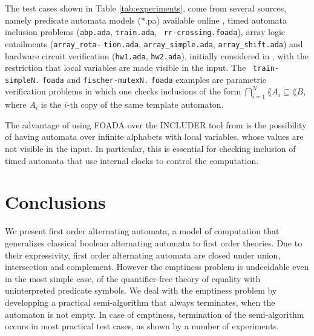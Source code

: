 The test cases shown in Table \ref{tab:experiments}, come from several
sources, namely predicate automata models (*.pa)
\cite{Farzan15,Farzan16} available online \cite{pa}, timed automata
inclusion problems ({\tt abp.ada}, {\tt train.ada}, {\tt
  rr-crossing.foada}), array logic entailments ({\tt array\_rota-}
{\tt tion.ada}, {\tt array\_simple.ada}, {\tt array\_shift.ada}) and
hardware circuit verification ({\tt hw1.ada}, {\tt hw2.ada}),
initially considered in \cite{IosifRV16}, with the restriction that
local variables are made visible in the input. The {\tt
  train-simpleN.} {\tt foada} and {\tt fischer-mutexN.} {\tt foada}
examples are parametric verification problems in which one checks
inclusions of the form $\bigcap_{i=1}^N\lang{A_i} \subseteq \lang{B}$,
where $A_i$ is the $i$-th copy of the same template automaton.

The advantage of using FOADA over the INCLUDER \cite{includer} tool
from \cite{IosifRV16} is the possibility of having automata over
infinite alphabets with local variables, whose values are not visible
in the input. In particular, this is essential for checking inclusion
of timed automata that use internal clocks to control the computation.

\section{Conclusions}

We present first order alternating automata, a model of computation
that generalizes classical boolean alternating automata to first order
theories. Due to their expressivity, first order alternating automata
are closed under union, intersection and complement. However the
emptiness problem is undecidable even in the most simple case, of the
quantifier-free theory of equality with uninterpreted predicate
symbols. We deal with the emptiness problem by developping a practical
semi-algorithm that always terminates, when the automaton is not
empty. In case of emptiness, termination of the semi-algorithm occurs
in most practical test cases, as shown by a number of experiments.
